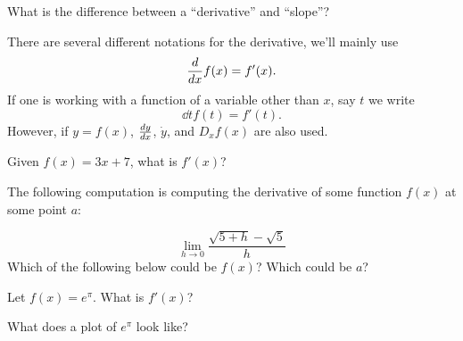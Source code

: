 \documentclass{ximera}
\begin{document}
\begin{question}
  What is the difference between a ``derivative'' and ``slope''?
    \begin{multipleChoice}
    \end{multipleChoice}  
\end{question}

\begin{definition}
There are several different notations for the derivative, we'll mainly
use
\[
\frac{d}{dx} f(x) = f'(x).
\]
If one is working with a function of a variable other than $x$, say $t$ we write
\[
\dd{t} f(t) = f'(t).
\]
However, if $y = f(x)$, $\frac{dy}{dx}$, $\dot{y}$, and $D_x f(x)$ are
also used.
\end{definition}

\begin{question}
  Given $f(x) = 3x+7$, what is $f'(x)$?
    \begin{multipleChoice}
    \end{multipleChoice}  
\end{question}


\begin{question}
  The following computation is computing the derivative of some
  function $f(x)$ at some point $a$:

\[
\lim_{h\to 0} \frac{\sqrt{5+h}-\sqrt{5}}{h}
\]
Which of the following below could be $f(x)$? Which could be $a$?
    \begin{multipleChoice}
    \end{multipleChoice}  
\end{question}


\begin{question}
  Let $f(x) = e^\pi$. What is $f'(x)$?
  \begin{hint}
    What does a plot of $e^\pi$ look like?
  \end{hint}
    \begin{multipleChoice}
    \end{multipleChoice}  
\end{question}
\end{document}
